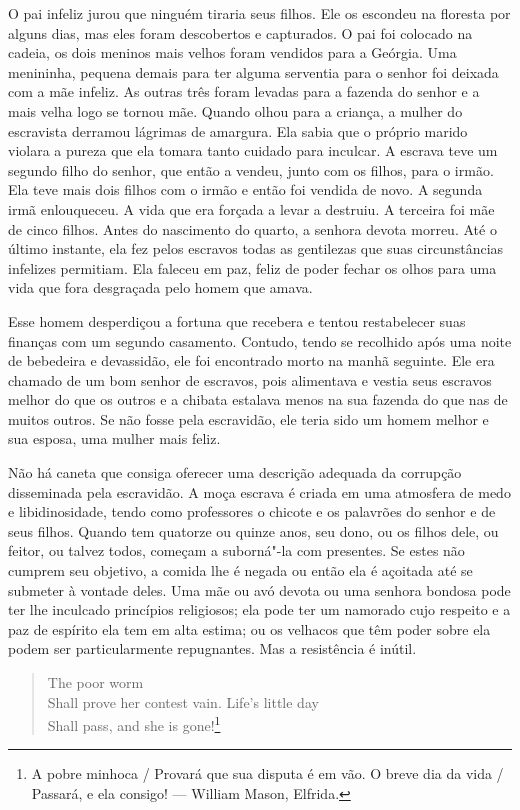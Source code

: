 O pai infeliz jurou que ninguém tiraria seus filhos. Ele os escondeu na
floresta por alguns dias, mas eles foram descobertos e capturados. O pai
foi colocado na cadeia, os dois meninos mais velhos foram vendidos para
a Geórgia. Uma menininha, pequena demais para ter alguma serventia para
o senhor foi deixada com a mãe infeliz. As outras três foram levadas
para a fazenda do senhor e a mais velha logo se tornou mãe. Quando olhou
para a criança, a mulher do escravista derramou lágrimas de amargura.
Ela sabia que o próprio marido violara a pureza que ela tomara tanto
cuidado para inculcar. A escrava teve um segundo filho do senhor, que
então a vendeu, junto com os filhos, para o irmão. Ela teve mais dois
filhos com o irmão e então foi vendida de novo. A segunda irmã
enlouqueceu. A vida que era forçada a levar a destruiu. A terceira foi
mãe de cinco filhos. Antes do nascimento do quarto, a senhora devota
morreu. Até o último instante, ela fez pelos escravos todas as
gentilezas que suas circunstâncias infelizes permitiam. Ela faleceu em
paz, feliz de poder fechar os olhos para uma vida que fora desgraçada
pelo homem que amava.

Esse homem desperdiçou a fortuna que
recebera e tentou restabelecer suas finanças com um segundo casamento.
Contudo, tendo se recolhido após uma noite de bebedeira e devassidão,
ele foi encontrado morto na manhã seguinte. Ele era chamado de um bom
senhor de escravos, pois alimentava e vestia seus escravos melhor do que
os outros e a chibata estalava menos na sua fazenda do que nas de muitos
outros. Se não fosse pela escravidão, ele teria sido um homem melhor e
sua esposa, uma mulher mais feliz.

Não há caneta que consiga oferecer uma
descrição adequada da corrupção disseminada pela escravidão. A moça
escrava é criada em uma atmosfera de medo e libidinosidade, tendo como
professores o chicote e os palavrões do senhor e de seus filhos. Quando
tem quatorze ou quinze anos, seu dono, ou os filhos dele, ou feitor, ou
talvez todos, começam a suborná"-la com presentes. Se estes não cumprem
seu objetivo, a comida lhe é negada ou então ela é açoitada até se
submeter à vontade deles. Uma mãe ou avó devota ou uma senhora bondosa
pode ter lhe inculcado princípios religiosos; ela pode ter um namorado
cujo respeito e a paz de espírito ela tem em alta estima; ou os velhacos
que têm poder sobre ela podem ser particularmente repugnantes. Mas a
resistência é inútil.

\begin{verse}
\quad [\ldots{}] The poor worm\\
Shall prove her contest vain. Life's little day\\
\quad Shall pass, and she is gone!\footnote{A pobre minhoca / Provará que
sua disputa é em vão. O breve dia da vida / Passará, e ela consigo!
--- William Mason, Elfrida.}
\end{verse}


